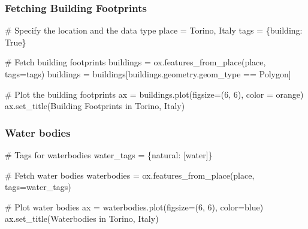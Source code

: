 \documentclass[
  letterpaper,
  DIV=11,
  numbers=noendperiod]{scrreprt}
\newenvironment{Shaded}{\begin{snugshade}}{\end{snugshade}}
\newcommand{\CommentTok}[1]{\textcolor[rgb]{0.37,0.37,0.37}{#1}}
\newcommand{\DecValTok}[1]{\textcolor[rgb]{0.68,0.00,0.00}{#1}}
\newcommand{\NormalTok}[1]{\textcolor[rgb]{0.00,0.23,0.31}{#1}}
\newcommand{\OperatorTok}[1]{\textcolor[rgb]{0.37,0.37,0.37}{#1}}
\newcommand{\StringTok}[1]{\textcolor[rgb]{0.13,0.47,0.30}{#1}}
\newcommand{\VariableTok}[1]{\textcolor[rgb]{0.07,0.07,0.07}{#1}}
\begin{document}
\hypertarget{fetching-building-footprints}{%
\subsubsection{Fetching Building
Footprints}\label{fetching-building-footprints}}

\begin{Shaded}
\begin{Highlighting}[]
\CommentTok{\# Specify the location and the data type}
\NormalTok{place }\OperatorTok{=} \StringTok{\textquotesingle{}Torino, Italy\textquotesingle{}}
\NormalTok{tags }\OperatorTok{=}\NormalTok{ \{}\StringTok{\textquotesingle{}building\textquotesingle{}}\NormalTok{: }\VariableTok{True}\NormalTok{\}}

\CommentTok{\# Fetch building footprints}
\NormalTok{buildings }\OperatorTok{=}\NormalTok{ ox.features\_from\_place(place, tags}\OperatorTok{=}\NormalTok{tags)}
\NormalTok{buildings }\OperatorTok{=}\NormalTok{ buildings[buildings.geometry.geom\_type }\OperatorTok{==} \StringTok{\textquotesingle{}Polygon\textquotesingle{}}\NormalTok{]}

\CommentTok{\# Plot the building footprints}
\NormalTok{ax }\OperatorTok{=}\NormalTok{ buildings.plot(figsize}\OperatorTok{=}\NormalTok{(}\DecValTok{6}\NormalTok{, }\DecValTok{6}\NormalTok{), color }\OperatorTok{=} \StringTok{\textquotesingle{}orange\textquotesingle{}}\NormalTok{)}
\NormalTok{ax.set\_title(}\StringTok{\textquotesingle{}Building Footprints in Torino, Italy\textquotesingle{}}\NormalTok{)}
\end{Highlighting}
\end{Shaded}

\hypertarget{water-bodies}{%
\subsubsection{Water bodies}\label{water-bodies}}

\begin{Shaded}
\begin{Highlighting}[]
\CommentTok{\# Tags for waterbodies}
\NormalTok{water\_tags }\OperatorTok{=}\NormalTok{ \{}\StringTok{\textquotesingle{}natural\textquotesingle{}}\NormalTok{: [}\StringTok{\textquotesingle{}water\textquotesingle{}}\NormalTok{]\}}

\CommentTok{\# Fetch water bodies}
\NormalTok{waterbodies }\OperatorTok{=}\NormalTok{ ox.features\_from\_place(place, tags}\OperatorTok{=}\NormalTok{water\_tags)}

\CommentTok{\# Plot water bodies}
\NormalTok{ax }\OperatorTok{=}\NormalTok{ waterbodies.plot(figsize}\OperatorTok{=}\NormalTok{(}\DecValTok{6}\NormalTok{, }\DecValTok{6}\NormalTok{), color}\OperatorTok{=}\StringTok{\textquotesingle{}blue\textquotesingle{}}\NormalTok{)}
\NormalTok{ax.set\_title(}\StringTok{\textquotesingle{}Waterbodies in Torino, Italy\textquotesingle{}}\NormalTok{)}
\end{Highlighting}
\end{Shaded}
\end{document}
